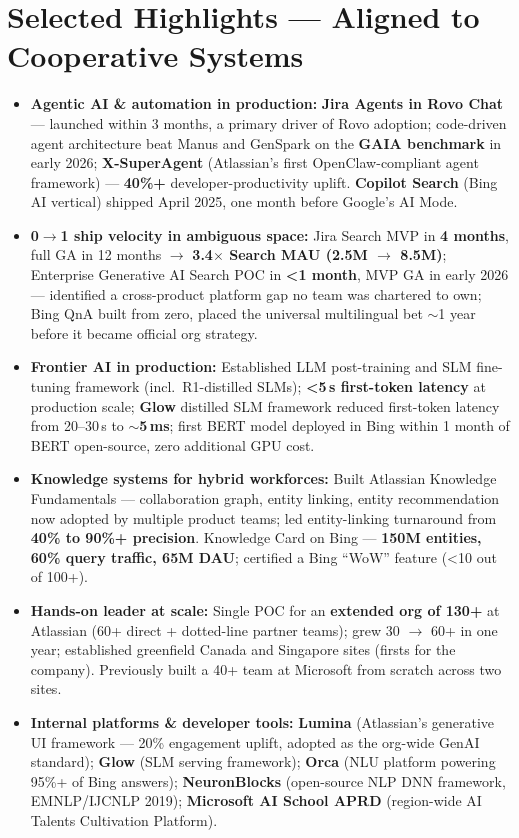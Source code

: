 \documentclass[10.5pt,letterpaper]{article}
\begin{document}
\section*{Selected Highlights --- Aligned to Cooperative Systems}
\begin{itemize}
  \item \textbf{Agentic AI \& automation in production:} \textbf{Jira Agents in Rovo Chat} --- launched within 3 months, a primary driver of Rovo adoption; code-driven agent architecture beat Manus and GenSpark on the \textbf{GAIA benchmark} in early 2026; \textbf{X-SuperAgent} (Atlassian's first OpenClaw-compliant agent framework) --- \textbf{40\%+} developer-productivity uplift. \textbf{Copilot Search} (Bing AI vertical) shipped April 2025, one month before Google's AI Mode.
  \item \textbf{0$\to$1 ship velocity in ambiguous space:} Jira Search MVP in \textbf{4 months}, full GA in 12 months $\to$ \textbf{3.4$\times$ Search MAU (2.5M $\to$ 8.5M)}; Enterprise Generative AI Search POC in \textbf{<1 month}, MVP GA in early 2026 --- identified a cross-product platform gap no team was chartered to own; Bing QnA built from zero, placed the universal multilingual bet $\sim$1 year before it became official org strategy.
  \item \textbf{Frontier AI in production:} Established LLM post-training and SLM fine-tuning framework (incl.\ R1-distilled SLMs); \textbf{<5\,s first-token latency} at production scale; \textbf{Glow} distilled SLM framework reduced first-token latency from 20--30\,s to \textbf{$\sim$5\,ms}; first BERT model deployed in Bing within 1 month of BERT open-source, zero additional GPU cost.
  \item \textbf{Knowledge systems for hybrid workforces:} Built Atlassian Knowledge Fundamentals --- collaboration graph, entity linking, entity recommendation now adopted by multiple product teams; led entity-linking turnaround from \textbf{40\% to 90\%+ precision}. Knowledge Card on Bing --- \textbf{150M entities, 60\% query traffic, 65M DAU}; certified a Bing ``WoW'' feature (<10 out of 100+).
  \item \textbf{Hands-on leader at scale:} Single POC for an \textbf{extended org of 130+} at Atlassian (60+ direct + dotted-line partner teams); grew 30 $\to$ 60+ in one year; established greenfield Canada and Singapore sites (firsts for the company). Previously built a 40+ team at Microsoft from scratch across two sites.
  \item \textbf{Internal platforms \& developer tools:} \textbf{Lumina} (Atlassian's generative UI framework --- 20\% engagement uplift, adopted as the org-wide GenAI standard); \textbf{Glow} (SLM serving framework); \textbf{Orca} (NLU platform powering 95\%+ of Bing answers); \textbf{NeuronBlocks} (open-source NLP DNN framework, EMNLP/IJCNLP 2019); \textbf{Microsoft AI School APRD} (region-wide AI Talents Cultivation Platform).

\end{itemize}
\end{document}
